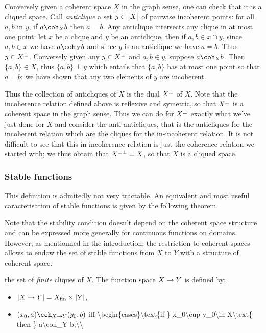 Conversely given a coherent space \(X\) in the graph sense, one can
check that it is a cliqued space. Call \emph{anticlique} a set
\(y\subset \left|X\right|\) of pairwise incoherent points: for all \(a, b\) in
\(y\), if \(a\coh_X b\) then \(a=b\). Any anticlique intersects any
clique in at most one point: let \(x\) be a clique and \(y\) be an
anticlique, then if \(a,b\in x\cap y\), since \(a, b\in x\) we have
\(a\coh_X b\) and since \(y\) is an anticlique we have \(a = b\). Thus
\(y\in X^\bot\). Conversely given any \(y\in X^\bot\) and \(a, b\in y\),
suppose \(a\coh_X b\). Then \(\{a,b\}\in X\), thus \(\{a,b\}\perp y\)
which entails that \(\{a, b\}\) has at most one point so that \(a = b\):
we have shown that any two elements of \(y\) are incoherent.

Thus the collection of anticliques of \(X\) is the dual \(X^\bot\) of
\(X\). Note that the incoherence relation defined above is reflexive and
symetric, so that \(X^\bot\) is a coherent space in the graph sense.
Thus we can do for \(X^\bot\) exactly what we've just done for \(X\) and
consider the anti-anticliques, that is the anticliques for the
incoherent relation which are the cliques for the in-incoherent
relation. It is not difficult to see that this in-incoherence relation
is just the coherence relation we started with; we thus obtain that
\(X^{\bot\bot} = X\), so that \(X\) is a cliqued space.

\subsubsection{Stable functions}\label{stable-functions}

This definition is admitedly not very tractable. An equivalent and most
useful caracterisation of stable functions is given by the following
theorem.

Note that the stability condition doesn't depend on the coherent space
structure and can be expressed more generally for continuous functions
on domains. However, as mentionned in the introduction, the restriction
to coherent spaces allows to endow the set of stable functions from
\(X\) to \(Y\) with a structure of coherent space.

 the set of \emph{finite} cliques of \(X\). The function space
\(X\rightarrow Y\) is defined by:

\begin{itemize}
\tightlist
\item
  \(\left|X\rightarrow Y\right| = X_{\mathrm{fin}}\times \left|Y\right|\),
\item
  \((x_0, a)\coh_{X\imp Y}(y_0, b)\) iff
  \textbackslash{}begin\{cases\}\textbackslash{}text\{if \}
  x\_0\textbackslash{}cup y\_0\textbackslash{}in X\textbackslash{}text\{
  then \} a\textbackslash{}coh\_Y b,\textbackslash{}\textbackslash{}
\end{itemize}

